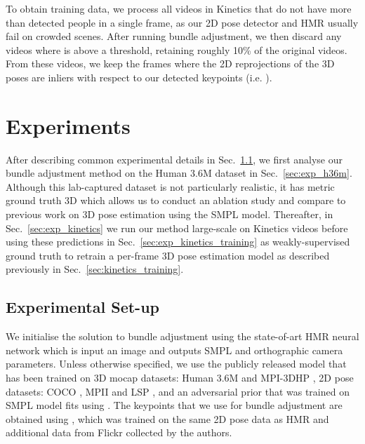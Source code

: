 \documentclass[10pt,twocolumn,letterpaper]{article}
\begin{document}
To obtain training data, we process all videos in Kinetics that do not have more than  detected people in a single frame, as our 2D pose detector and HMR usually fail on crowded scenes.
After running bundle adjustment, we then discard any videos where  is above a threshold, retaining roughly 10\% of the original videos.
From these videos, we keep the frames where the 2D reprojections of the 3D poses are inliers with respect to our detected keypoints 
(i.e. ).







 \section{Experiments}

After describing common experimental details in Sec.~\ref{sec:exp_setup}, we first analyse our bundle adjustment method on the Human 3.6M dataset in Sec.~\ref{sec:exp_h36m}.
Although this lab-captured dataset is not particularly realistic, it has metric ground truth 3D which allows us to conduct an ablation study and compare to previous work on 3D pose estimation using the SMPL model.
Thereafter, in Sec.~\ref{sec:exp_kinetics} we run our method large-scale on Kinetics videos before using these predictions in Sec.~\ref{sec:exp_kinetics_training} as weakly-supervised ground truth to retrain a per-frame 3D pose estimation model as described previously in Sec.~\ref{sec:kinetics_training}.

\subsection{Experimental Set-up}
\label{sec:exp_setup}

We initialise the solution to bundle adjustment using the state-of-art HMR neural network \cite{kanazawa_cvpr_2018} which is input an image and outputs SMPL and orthographic camera parameters. 
Unless otherwise specified, we use the publicly released model that has been trained on 3D mocap datasets: Human 3.6M \cite{ionescu_pami_2014} and MPI-3DHP \cite{mehta_3dv_2017}, 2D pose datasets: COCO \cite{lin_eccv_2014}, MPII \cite{andriluka_cvpr_2014} and LSP \cite{johnson_bmvc_2010}, and an adversarial prior that was trained on SMPL model fits using \cite{loper_tog_2014}.
The keypoints that we use for bundle adjustment are obtained using \cite{papandreou_cvpr_2017}, which was trained on the same 2D pose data as HMR and additional data from Flickr collected by the authors.
\end{document}
